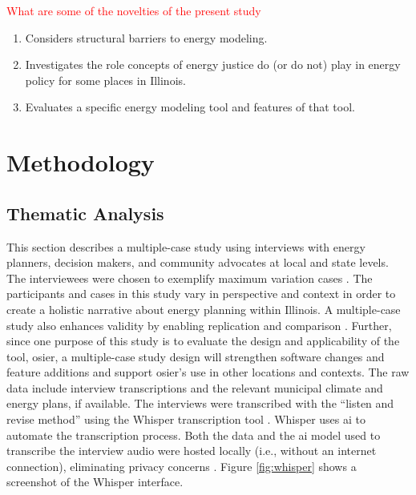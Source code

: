 \textcolor{red}{What are some of the novelties of the present study}
\begin{enumerate}
    \item Considers structural barriers to energy modeling.
    \item Investigates the role concepts of energy justice do (or do not) play
    in energy policy for some places in Illinois.
    \item Evaluates a specific energy modeling tool and features of that tool.
\end{enumerate}
 

\section{Methodology}
\label{section:interview-methods}

\subsection{Thematic Analysis}
This section describes a multiple-case study using interviews with energy
planners, decision makers, and community advocates at local and state levels.
The interviewees were chosen to exemplify maximum variation cases
\cite{flyvbjerg_five_2006}. The participants and cases in this study vary in
perspective and context in order to create a holistic narrative about energy
planning within Illinois. A multiple-case study also enhances validity by
enabling replication and comparison \cite{johannsen_designing_2021,
yin_case_2018}. Further, since one purpose of this study is to evaluate the
design and applicability of the tool, \ac{osier}, a multiple-case study design
will strengthen software changes and feature additions and support \ac{osier}'s
use in other locations and contexts. The raw data include interview transcriptions
and the relevant municipal climate and energy plans, if available. The
interviews were transcribed with the ``listen and revise method'' using the
Whisper transcription tool \cite{battaglia_listen_2024}. Whisper uses \ac{ai} to
automate the transcription process. Both the data and the \ac{ai} model used to
transcribe the interview audio were hosted locally (i.e., without an internet
connection), eliminating privacy concerns \cite{battaglia_listen_2024}. Figure
\ref{fig:whisper} shows a screenshot of the Whisper interface. 

